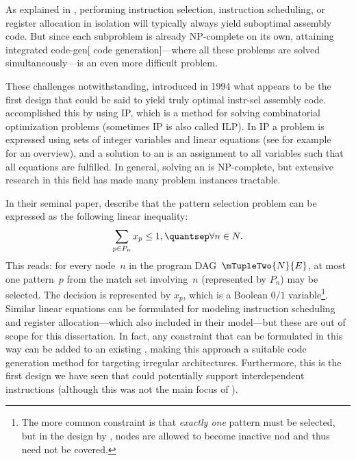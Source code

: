 As explained in , performing \gls{instruction
  selection}, \gls{instruction scheduling}, or \gls{register allocation} in
isolation will typically always yield suboptimal \gls{assembly code}.
%
But since
each subproblem is already NP-complete on its own, attaining
\gls{integrated code-gen}[ \gls{code generation}]---where all these problems
are solved simultaneously---is an even more difficult problem.

These challenges notwithstanding, \textcite{Wilson1994} introduced in 1994 what
appears to be the first design that could be said to yield truly \gls{optimal
  instr-sel} \gls{assembly code}.
%
\citeauthor{Wilson1994} accomplished this by
using \gls{IP}, which is a method for solving combinatorial optimization
problems (sometimes \gls{IP} is also called \gls{ILP}).
%
In \gls{IP} a problem is
expressed using sets of \glspl{integer variable} and linear equations (see for
example~\cite{Wolsey1998} for an overview), and a solution to an \tIPmodel is an
assignment to all variables such that all equations are fulfilled.
%
In general,
solving an \tIPmodel is NP-complete, but extensive research in this field
has made many problem instances tractable.

In their seminal paper, \citeauthor{Wilson1994} describe that the \gls{pattern
  selection} problem can be expressed as the following linear inequality:
%
\begin{displaymath}
  \sum_{p \in P_n} x_p \leq 1, \quantsep \forall n \in N.
\end{displaymath}
%
This reads: for every \gls{node}~$n$ in the \gls{program
  DAG}~\mbox{$\mTupleTwo{N}{E}$}, at most one \gls{pattern}~$p$ from the
\gls{match set} involving~$n$ (represented by $P_n$) may be selected.
%
The
decision is represented by $x_p$, which is a Boolean \mbox{$0/1$}
variable\footnote{The more common constraint is that \emph{exactly one}
  \gls{pattern} must be selected, but in the design by \citeauthor{Wilson1994},
  \glspl{node} are allowed to become \gls{inactive nod} and thus need not be
  covered.}.
%
Similar linear equations can be formulated for modeling
\gls{instruction scheduling} and \gls{register allocation}---which
\citeauthor{Wilson1994} also included in their model---but these are out of
scope for this dissertation.
%
In fact, any constraint that can be formulated in this way
can be added to an existing \tIPmodel, making this approach a suitable \gls{code
  generation} method for targeting irregular architectures.
%
Furthermore, this is
the first design we have seen that could potentially support
\glspl{interdependent instruction} (although this was not the main focus of
\citeauthor{Wilson1994}).

